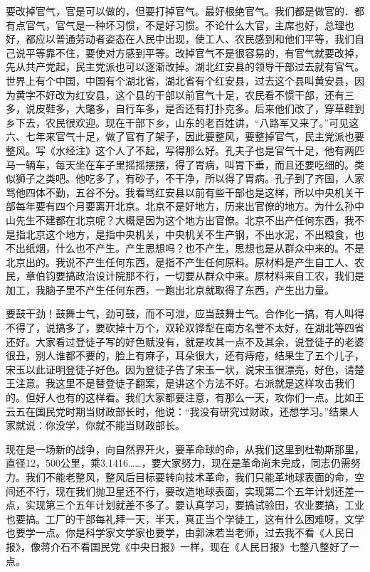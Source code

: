要改掉官气，官是可以做的，但要打掉官气。最好根绝官气。我们都是做官的．都有点官气，官气是一种坏习惯，不是好习惯。不论什么大官，主席也好，总理也好，都应以普通劳动者姿态在人民中出现，使工人、农民感到和他们平等，我们自己说平等靠不住，要使对方感到平等。改掉官气不是很容易的，有官气就要改掉，先从共产党起，民主党派也可以逐渐改掉。湖北红安县的领导干部过去就有官气。世界上有个中国，中国有个湖北省，湖北省有个红安县，过去这个县叫黄安县，因为黄字不好改为红安县，这个县的干部以前官气十足，农民看不惯干部，还有三多，说皮鞋多，大氅多，自行车多，是否还有打扑克多。后来他们改了，穿草鞋到乡下去，农民很欢迎。现在干部下乡，山东的老百姓讲，“八路军又来了。”可见这六、七年来官气十足，做了官有了架子，因此要整风，要整掉官气，民主党派也要整风。写《水经注》这个人了不起，写得那么好。孔夫子也是官气十足，他有两匹马一辆车，每天坐在车子里摇摇摆摆，得了胃病，叫胃下垂，而且还要吃细的。类似狮子之类吧。他吃多了，有砂子，不干净，所以得了胃病。孔子到了齐国，人家骂他四体不勤，五谷不分。我看骂红安县以前有些干部也是这样，所以中央机关干部每年要有四个月要离开北京。北京不是好地方，历来出官僚的地方。为什么孙中山先生不建都在北京呢？大概是因为这个地方出官僚。北京不出产任何东西，我不是指北京这个地方，是指中央机关，中央机关不生产钢，不出水泥，不出粮食，也不出纸烟，什么也不产生。产生思想吗？也不产生，思想也是从群众中来的。不是北京出的。我说不产生任何东西，是指不产生任何原料。原材料是产生自工人、农民，章伯钧要搞政治设计院那不行，一切要从群众中来。原材料来自工农，我们是加工，我脑子里不产生任何东西，一跑出北京就取得了东西，产生出力量。

要鼓干劲！鼓舞士气，劲可鼓，而不可泄，应当鼓舞士气。合作化一搞，有人叫得不得了，说搞多了，要砍掉十万个，双轮双铧犁在南方名誉不太好，在湖北等四省还好。大家看过登徒子写的好色赋没有，就是攻其一点不及其余，说登徒子的老婆很丑，别人谁都不要的，脸上有麻子，耳朵很大，还有痔疮，结果生了五个儿子，宋玉以此证明登徒子好色。因为登徒子告了宋玉一状，说宋玉很漂亮，好色，请楚王注意。我这里不是替登徒子翻案，是讲这个方法不好。右派就是这样攻击我们的。但好人也有的这样看。我们大家都要注意，有那么一天，攻你们一点。比如王云五在国民党时期当财政部长时，他说：“我没有研究过财政，还想学习。”结果人家就说：你没学，你就不能当财政部长。

现在是一场新的战争，向自然界开火，要革命球的命，从我们这里到杜勒斯那里，直径12，500公里，乘3.1416……，要大家努力，现在是革命尚未完成，同志仍需努力。我们不能老整风，整风后目标要转向技术革命，我们只能革地球表面的命，空间还不行，现在我们抛卫星还不行，要改造地球表面，实现第二个五年计划还差一点，实现第三个五年计划就差不多了。要认真学习，要搞试验田，农业要搞，工业也要搞。工厂的干部每礼拜一天，半天，真正当个学徒工，这有什么困难呀，文学也要学一点。你是科学家文学家也要学，由郭沫若当老师，过去我不看《人民日报》，像蒋介石不看国民党《中央日报》一样，现在《人民日报》七整八整好了一点。

